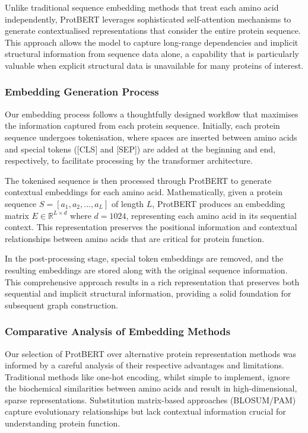 \documentclass[12pt,a4paper]{article}
\begin{document}
Unlike traditional sequence embedding methods that treat each amino acid independently, ProtBERT leverages sophisticated self-attention mechanisms to generate contextualised representations that consider the entire protein sequence. This approach allows the model to capture long-range dependencies and implicit structural information from sequence data alone, a capability that is particularly valuable when explicit structural data is unavailable for many proteins of interest.

\subsubsection{Embedding Generation Process}

Our embedding process follows a thoughtfully designed workflow that maximises the information captured from each protein sequence. Initially, each protein sequence undergoes tokenisation, where spaces are inserted between amino acids and special tokens ([CLS] and [SEP]) are added at the beginning and end, respectively, to facilitate processing by the transformer architecture.

The tokenised sequence is then processed through ProtBERT to generate contextual embeddings for each amino acid. Mathematically, given a protein sequence $S = [a_1, a_2, ..., a_L]$ of length $L$, ProtBERT produces an embedding matrix $E \in \mathbb{R}^{L \times d}$ where $d = 1024$, representing each amino acid in its sequential context. This representation preserves the positional information and contextual relationships between amino acids that are critical for protein function.

In the post-processing stage, special token embeddings are removed, and the resulting embeddings are stored along with the original sequence information. This comprehensive approach results in a rich representation that preserves both sequential and implicit structural information, providing a solid foundation for subsequent graph construction.

\subsubsection{Comparative Analysis of Embedding Methods}

Our selection of ProtBERT over alternative protein representation methods was informed by a careful analysis of their respective advantages and limitations. Traditional methods like one-hot encoding, whilst simple to implement, ignore the biochemical similarities between amino acids and result in high-dimensional, sparse representations. Substitution matrix-based approaches (BLOSUM/PAM) capture evolutionary relationships but lack contextual information crucial for understanding protein function.
\end{document}
